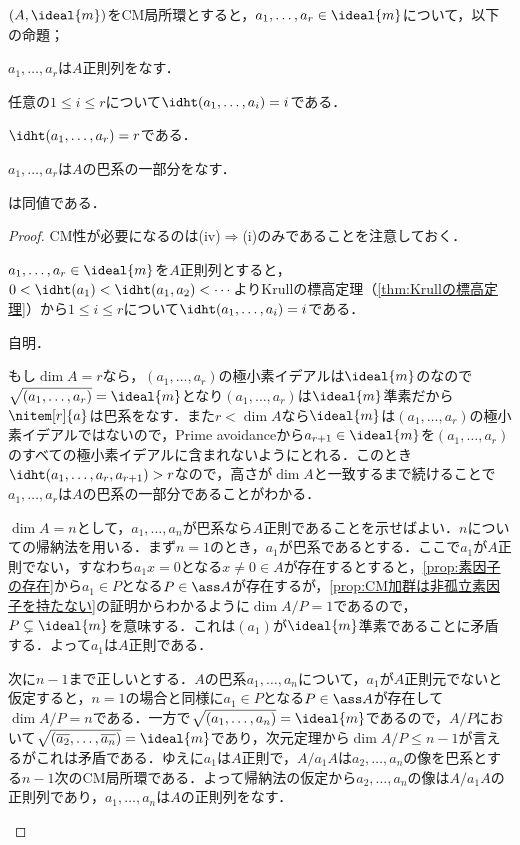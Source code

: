 \begin{prop}\label{prop:CM局所環での正則列と巴系}
	$(A,\ideal{m})$をCM局所環とすると，$a_1,\dots,a_r\in\ideal{m}$について，以下の命題；
	\begin{sakura}
		\item $a_1,\dots,a_r$は$A$正則列をなす．
		\item 任意の$1\leq i\leq r$について$\idht (a_1,\dots,a_i)=i$である．
		\item $\idht (a_1,\dots,a_r)=r$である．
		\item $a_1,\dots,a_r$は$A$の巴系の一部分をなす．
	\end{sakura}
	は同値である．	
\end{prop}

\begin{proof}	
	CM性が必要になるのは(iv)$\Longrightarrow$(i)のみであることを注意しておく．
	\begin{eqv}[4]
		\item 
		$a_1,\dots,a_r\in\ideal{m}$を$A$正則列とすると，$0<\idht(a_1)<\idht(a_1,a_2)<\cdots$よりKrullの標高定理（\ref{thm:Krullの標高定理}）から$1\leq i\leq r$について$\idht (a_1,\dots,a_i)=i$である．
		\item 自明．
		\item もし$\dim A=r$なら，$(a_1,\dots,a_r)$の極小素イデアルは$\ideal{m}$のなので$\sqrt{(a_1,\dots,a_r)}=\ideal{m}$となり$(a_1,\dots,a_r)$は$\ideal{m}$準素だから$\nitem[r]{a}$は巴系をなす．また$r<\dim A$なら$\ideal{m}$は$(a_1,\dots,a_r)$の極小素イデアルではないので，Prime avoidanceから$a_{r+1}\in\ideal{m}$を$(a_1,\dots,a_r)$のすべての極小素イデアルに含まれないようにとれる．このとき$\idht(a_1,\dots,a_r,a_{r+1})>r$なので，高さが$\dim A$と一致するまで続けることで$a_1,\dots,a_r$は$A$の巴系の一部分であることがわかる．
		\item $\dim A=n$として，$a_1,\dots,a_n$が巴系なら$A$正則であることを示せばよい．$n$についての帰納法を用いる．まず$n=1$のとき，$a_1$が巴系であるとする．ここで$a_1$が$A$正則でない，すなわち$a_1x=0$となる$x\neq0\in A$が存在するとすると，\ref{prop:素因子の存在}から$a_1\in P$となる$P\in\ass A$が存在するが，\ref{prop:CM加群は非孤立素因子を持たない}の証明からわかるように$\dim A/P=1$であるので，$P\subsetneq\ideal{m}$を意味する．これは$(a_1)$が$\ideal{m}$準素であることに矛盾する．よって$a_1$は$A$正則である．
		
		次に$n-1$まで正しいとする．$A$の巴系$a_1,\dots,a_n$について，$a_1$が$A$正則元でないと仮定すると，$n=1$の場合と同様に$a_1\in P$となる$P\in\ass A$が存在して$\dim A/P=n$である．一方で$\sqrt{(a_1,\dots,a_n)}=\ideal{m}$であるので，$A/P$において$\sqrt{(\bar{a_2},\dots,\bar{a_n})}=\ideal{m}$であり，次元定理から$\dim A/P\leq n-1$が言えるがこれは矛盾である．ゆえに$a_1$は$A$正則で，$A/a_1A$は$a_2,\dots,a_n$の像を巴系とする$n-1$次のCM局所環である．よって帰納法の仮定から$a_2,\dots,a_n$の像は$A/a_1A$の正則列であり，$a_1,\dots,a_n$は$A$の正則列をなす．
	\end{eqv}
\end{proof}

